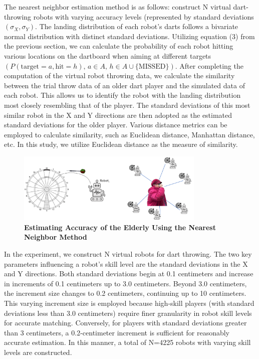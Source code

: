 \documentclass[cjjs]{ipart}
\theoremstyle{plain}
\begin{document}
The nearest neighbor estimation method is as follows: construct N virtual dart-throwing robots with varying accuracy levels (represented by standard deviations$(\sigma_X, \sigma_Y)$. The landing distribution of each robot's darts follows a bivariate normal distribution with distinct standard deviations. Utilizing equation (3) from the previous section, we can calculate the probability of each robot hitting various locations on the dartboard when aiming at different targets$\left( P(\text{target}=a, \text{hit}=h),\, a \in A, \, h \in A \cup \{\text{MISSED}\} \right)$. After completing the computation of the virtual robot throwing data, we calculate the similarity between the trial throw data of an older dart player and the simulated data of each robot. This allows us to identify the robot with the landing distribution most closely resembling that of the player. The standard deviations of this most similar robot in the X and Y directions are then adopted as the estimated standard deviations for the older player. Various distance metrics can be employed to calculate similarity, such as Euclidean distance, Manhattan distance, etc. In this study, we utilize Euclidean distance as the measure of similarity.

\begin{figure}[h]
    \centering
    \includegraphics[width=0.80\textwidth]{3.png} 
    \caption{\textbf{Estimating Accuracy
of the Elderly Using the Nearest Neighbor Method}}
    \label{fig:dartboard}
\end{figure}


In the experiment, we construct N virtual robots for dart throwing. The two key parameters influencing a robot's skill level are the standard deviations in the X and Y directions. Both standard deviations begin at 0.1 centimeters and increase in increments of 0.1 centimeters up to 3.0 centimeters. Beyond 3.0 centimeters, the increment size changes to 0.2 centimeters, continuing up to 10 centimeters. This varying increment size is employed because high-skill players (with standard deviations less than 3.0 centimeters) require finer granularity in robot skill levels for accurate matching. Conversely, for players with standard deviations greater than 3 centimeters, a 0.2-centimeter increment is sufficient for reasonably accurate estimation. In this manner, a total of N=4225 robots with varying skill levels are constructed.
\end{document}
